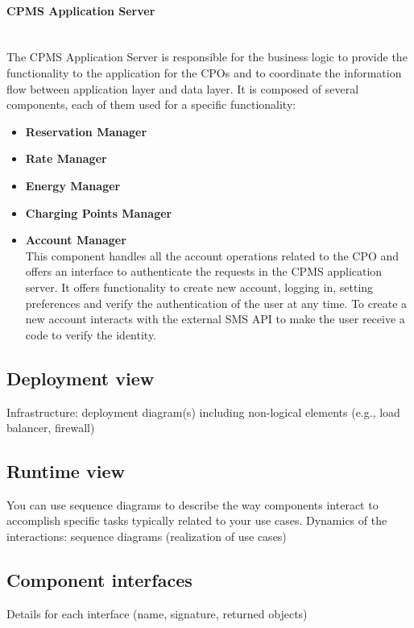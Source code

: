 \paragraph*{CPMS Application Server} \hfill \\
The CPMS Application Server is responsible for the business logic to provide the functionality to the application for the CPOs and to coordinate the information flow between application layer and data layer.
It is composed of several components, each of them used for a specific functionality:\\
\begin{itemize}
    \item \textbf{Reservation Manager} \\
    \item \textbf{Rate Manager} \\
    \item \textbf{Energy Manager} \\
    \item \textbf{Charging Points Manager} \\
    \item \textbf{Account Manager} \\ This component handles all the account operations related to the CPO and offers an interface to authenticate the requests in the CPMS application server.
          It offers functionality to create new account, logging in, setting preferences and verify the authentication of the user at any time.
          To create a new account interacts with the external SMS API to make the user receive a code to verify the identity.
\end{itemize}

\subsection{Deployment view}
Infrastructure: deployment diagram(s) including non-logical elements (e.g., load balancer, firewall)

\subsection{Runtime view}
You can use sequence diagrams to describe the way components interact to accomplish specific tasks typically related to your use cases. Dynamics of the interactions: sequence
diagrams (realization of use cases)

\subsection{Component interfaces}
Details for each interface (name, signature, returned objects)
